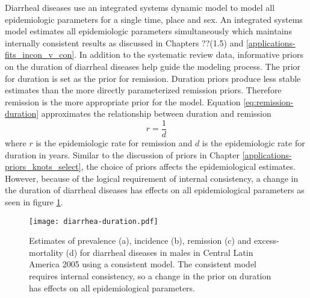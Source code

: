 Diarrheal diseases use an integrated systems dynamic model to model all epidemiologic parameters for a single time, place and sex.  An integrated systems model estimates all epidemiologic parameters simultaneously which maintains internally consistent results as discussed in Chapters ??(1.5) and \ref{applications-fits_incon_v_con}.  In addition to the systematic review data, informative priors  on the duration of diarrheal diseases help guide the modeling process.  The prior for duration is set as the prior for remission.  Duration priors produce less stable estimates than the more directly parameterized remission priors.  Therefore remission is the more appropriate prior for the model.  Equation \ref{eq:remission-duration} approximates the relationship between duration and remission
    \begin{equation} \label{eq:remission-duration}
    	r = \frac{1}{d}
    \end{equation}
where $r$ is the epidemiologic rate for remission and $d$ is the epidemiologic rate for duration in years.  Similar to the discussion of priors in Chapter \ref{applications-priors_knots_select}, the choice of priors affects the epidemiological estimates.  However, because of the logical requirement of internal consistency, a change in the duration of diarrheal diseases has effects on all epidemiological parameters as seen in figure \ref{fig:app-diarrhea duration}.

    \begin{figure}[h]
        \begin{center}
            \texttt{[image: diarrhea-duration.pdf]}
            \caption{Estimates of prevalence (a), incidence (b), remission (c) and excess-mortality (d) for diarrheal diseases in males in Central Latin America 2005 using a consistent model.  The consistent model requires internal consistency, so a change in the prior on duration has effects on all epidemiological parameters.}
            \label{fig:app-diarrhea duration}
        \end{center}
    \end{figure}
